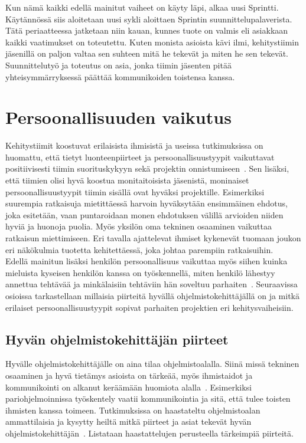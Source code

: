 \documentclass[finnish]{../tktltiki2}
\theoremstyle{definition}
\theoremstyle{remark}
\begin{document}
Kun nämä kaikki edellä mainitut vaiheet on käyty läpi, alkaa uusi
Sprintti. Käytännössä siis aloitetaan uusi sykli aloittaen
Sprintin suunnittelupalaverista. Tätä periaatteessa jatketaan
niin kauan, kunnes tuote on valmis eli asiakkaan kaikki vaatimukset
on toteutettu. Kuten monista asioista kävi ilmi, kehitystiimin jäsenillä on paljon valtaa sen suhteen mitä he tekevät ja miten he
sen tekevät. Suunnittelutyö ja toteutus on asia, jonka tiimin
jäsenten pitää yhteisymmärryksessä päättää kommunikoiden toistensa kanssa.

\section{Persoonallisuuden vaikutus}

Kehitystiimit koostuvat erilaisista ihmisistä ja useissa tutkimuksissa on huomattu, että tietyt
luonteenpiirteet ja persoonallisuustyypit vaikuttavat positiivisesti tiimin suorituskykyyn sekä
projektin onnistumiseen~\cite{Acuna:2008:ESP:1414004.1414056,Gorla:2004:WWB:990680.990684,Capretz:2003:PTS:766407.766410,Capretz:2010:MSS:1726559.1726574}. Sen lisäksi, että tiimien olisi hyvä koostua monitaitoisista
jäsenistä, moninaiset persoonallisuustyypit tiimin sisällä ovat hyväksi
projektille. Esimerkiksi suurempia ratkaisuja mietittäessä harvoin hyväksytään
ensimmäinen ehdotus, joka esitetään, vaan puntaroidaan monen ehdotuksen
välillä arvioiden niiden hyviä ja huonoja puolia. Myös yksilön oma
tekninen osaaminen vaikuttaa ratkaisun miettimiseen. Eri tavalla ajattelevat ihmiset kykenevät tuomaan joukon
eri näkökulmia tuotetta kehitettäessä, joka johtaa parempiin ratkaisuihin.\\

Edellä mainitun lisäksi henkilön persoonallisuus vaikuttaa myös
siihen
kuinka mieluista kyseisen henkilön kanssa on työskennellä,
miten henkilö lähestyy annettua tehtävää ja minkälaisiin tehtäviin
hän soveltuu parhaiten~\cite{Begel:2008:PPW:1414004.1414026,Capretz:2010:MSS:1726559.1726574}.
Seuraavissa osioissa tarkastellaan millaisia piirteitä hyvällä
ohjelmistokehittäjällä on ja mitkä erilaiset persoonallisuustyypit
sopivat parhaiten projektien eri kehitysvaiheisiin.

\subsection{Hyvän ohjelmistokehittäjän piirteet}

Hyvälle ohjelmistokehittäjälle on aina tilaa ohjelmistoalalla.
Siinä missä tekninen osaaminen ja hyvä tietämys asioista on
tärkeää, myös ihmistaidot ja kommunikointi on alkanut keräämään
huomiota alalla~\cite{Hall:2007:CNT:1235000.1235043}. Esimerkiksi
pariohjelmoinnissa työskentely vaatii kommunikointia ja sitä, että
tulee toisten ihmisten kanssa toimeen.
Tutkimuksissa
on haastateltu ohjelmistoalan ammattilaisia ja kysytty heiltä mitkä
piirteet ja asiat tekevät hyvän ohjelmistokehittäjän~\cite{Acuna:2008:ESP:1414004.1414056,Begel:2008:PPW:1414004.1414026,Hall:2007:CNT:1235000.1235043}. Listataan haastattelujen perusteella tärkeimpiä
piirteitä.
\end{document}
